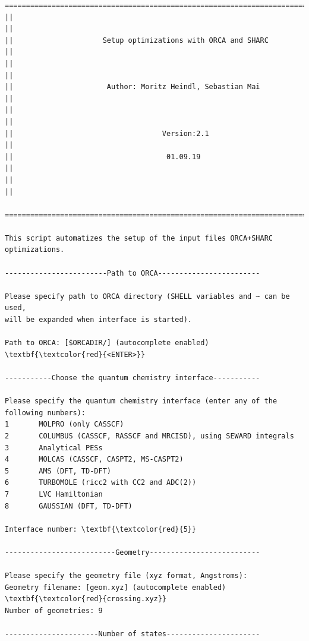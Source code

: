 \documentclass[a4paper,11pt,DIV=15,openany]{scrbook}
\begin{document}
\begin{oframed}
\footnotesize\begin{Verbatim}[commandchars=\\\{\}]
  ================================================================================
||                                                                                ||
||                     Setup optimizations with ORCA and SHARC                    ||
||                                                                                ||
||                      Author: Moritz Heindl, Sebastian Mai                      ||
||                                                                                ||
||                                   Version:2.1                                  ||
||                                    01.09.19                                    ||
||                                                                                ||
  ================================================================================

This script automatizes the setup of the input files ORCA+SHARC optimizations. 
  
------------------------Path to ORCA------------------------

Please specify path to ORCA directory (SHELL variables and ~ can be used, 
will be expanded when interface is started).

Path to ORCA: [$ORCADIR/] (autocomplete enabled) \textbf{\textcolor{red}{<ENTER>}}

-----------Choose the quantum chemistry interface-----------

Please specify the quantum chemistry interface (enter any of the following numbers):
1       MOLPRO (only CASSCF)
2       COLUMBUS (CASSCF, RASSCF and MRCISD), using SEWARD integrals
3       Analytical PESs
4       MOLCAS (CASSCF, CASPT2, MS-CASPT2)
5       AMS (DFT, TD-DFT)
6       TURBOMOLE (ricc2 with CC2 and ADC(2))
7       LVC Hamiltonian
8       GAUSSIAN (DFT, TD-DFT)

Interface number: \textbf{\textcolor{red}{5}}

--------------------------Geometry--------------------------

Please specify the geometry file (xyz format, Angstroms):
Geometry filename: [geom.xyz] (autocomplete enabled) \textbf{\textcolor{red}{crossing.xyz}}
Number of geometries: 9

----------------------Number of states----------------------



\end{Verbatim}
\end{oframed}
\end{document}
